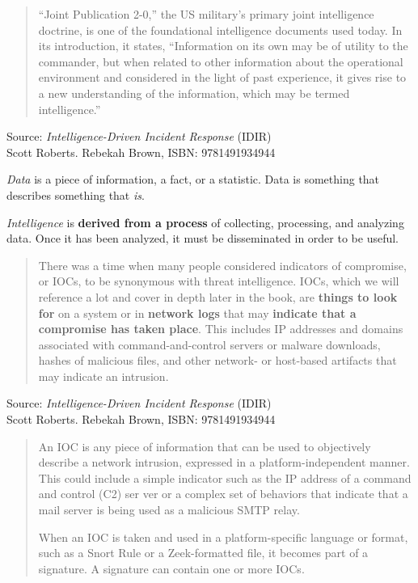 \documentclass[Screen16to9,17pt]{foils}
\begin{document}


\begin{quote}
“Joint Publication 2-0,” the US military’s primary joint intelligence doctrine, is one of
the foundational intelligence documents used today. In its introduction, it states,
“Information on its own may be of utility to the commander, but when related to
other information about the operational environment and considered in the light of
past experience, it gives rise to a new understanding of the information, which may
be termed intelligence.”
\end{quote}
Source: \emph{Intelligence-Driven Incident Response} (IDIR)\\
 Scott Roberts. Rebekah Brown, ISBN: 9781491934944

\begin{list2}
\item \emph{Data} is a piece of information, a fact, or a statistic. Data is something that describes something that \emph{is}.
\item \emph{Intelligence} is {\bf derived from a process} of collecting, processing, and analyzing data. Once it has been analyzed, it must be disseminated in order to be useful.
\end{list2}


\begin{quote}
There was a time when many people considered indicators of compromise, or IOCs,
to be synonymous with threat intelligence. IOCs, which we will reference a lot and
cover in depth later in the book, are {\bf things to look for} on a system or in {\bf network logs} that may {\bf indicate that a compromise has taken place}. This includes IP addresses and domains associated with command-and-control servers or malware downloads, hashes of malicious files, and other network- or host-based artifacts that may indicate an intrusion.
\end{quote}
Source: \emph{Intelligence-Driven Incident Response} (IDIR)\\
 Scott Roberts. Rebekah Brown, ISBN: 9781491934944




\begin{quote}
An IOC is any piece of information that can be used to objectively describe a
network intrusion, expressed in a platform-independent manner. This could include a simple indicator such as the IP address of a command and control (C2) ser
ver or a complex set of behaviors that indicate that a mail server is being used as a malicious SMTP relay.

When an IOC is taken and used in a platform-specific language or format, such as a Snort Rule or a Zeek-formatted file, it becomes part of a signature. A signature can contain one or more IOCs.
\end{quote}
\end{document}
